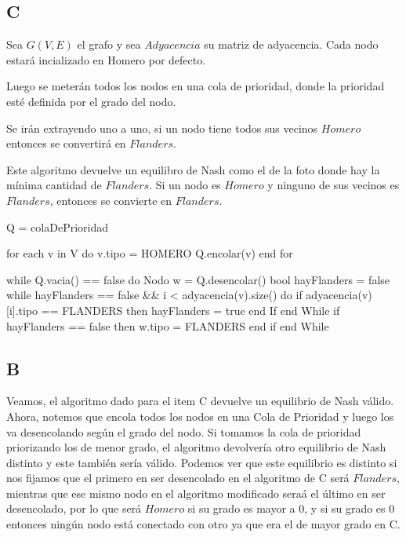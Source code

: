 \documentclass[a4paper]{article}
\begin{document}
\subsection{C}

Sea $G(V,E)$ el grafo y sea $Adyacencia$ su matriz de adyacencia.
Cada nodo estará incializado en Homero por defecto.

Luego se meterán todos los nodos en una cola de prioridad, donde la prioridad esté definida por el grado del nodo.

Se irán extrayendo uno a uno, si un nodo tiene todos sus vecinos $Homero$ entonces se convertirá en $Flanders$.

Este algoritmo devuelve un equilibro de Nash como el de la foto donde hay la mínima cantidad de $Flanders$. Si un nodo es $Homero$ y ninguno de sus vecinos es $Flanders$, entonces se convierte en $Flanders$.\\ 


\begin{codesnippet}
Q = colaDePrioridad

for each v in V do
	v.tipo = HOMERO
	Q.encolar(v)
end for

while Q.vacia() == false do
	Nodo w = Q.desencolar()
    bool hayFlanders = false
    while hayFlanders == false && i < adyacencia(v).size() do
    	if adyacencia(v)[i].tipo == FLANDERS then
        	hayFlanders = true
        end If    
	end While
    if hayFlanders == false then
    	w.tipo = FLANDERS
    end if
end While    
\end{codesnippet}

\subsection{B}

Veamos, el algoritmo dado para el item C devuelve un equilibrio de Nash válido. Ahora, notemos que encola todos los nodos en una Cola de Prioridad y luego los va desencolando según el grado del nodo. Si tomamos la cola de prioridad priorizando los de menor grado, el algoritmo devolvería otro equilibrio de Nash distinto y este también sería válido. Podemos ver que este equilibrio es distinto si nos fijamos que el primero en ser desencolado en el algoritmo de C será $Flanders$, mientras que ese mismo nodo en el algoritmo modificado seraá el último en ser desencolado, por lo que será $Homero$ si su grado es mayor a 0, y si su grado es 0 entonces ningún nodo está conectado con otro ya que era el de mayor grado en C.
\end{document}

